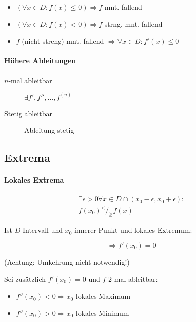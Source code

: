 \begin{itemize}
  \item $(\forall x \in D: f(x) \leq 0) \Rightarrow f$ mnt. fallend
  \item $(\forall x \in D: f(x) < 0) \Rightarrow f$ strng. mnt. fallend
  \item $f$ (nicht streng) mnt. fallend $\Rightarrow \forall x \in D: f'(x) \leq 0$
\end{itemize}

\paragraph{Höhere Ableitungen}

\begin{description}
  \item[$n$-mal ableitbar] $\exists f', f'', \dots, f^{(n)}$
  \item[Stetig ableitbar] Ableitung stetig
\end{description}

\subsection{Extrema}

\paragraph{Lokales Extrema}

\begin{gather*}
  \exists \epsilon > 0 \forall x \in D \cap (x_0 - \epsilon, x_0 + \epsilon):\\
  f(x_0) {}^{\leq}/_{\geq} f(x)
\end{gather*}

Ist $D$ Intervall und $x_0$ innerer Punkt und lokales Extremum:

$$\Rightarrow f'(x_0) = 0$$

(Achtung: Umkehrung nicht notwendig!)

Sei zusätzlich $f'(x_0) = 0$ und $f$ $2$-mal ableitbar:

\begin{itemize}
  \item $f''(x_0) < 0 \Rightarrow x_0$ lokales Maximum
  \item $f''(x_0) > 0 \Rightarrow x_0$ lokales Minimum
\end{itemize}

